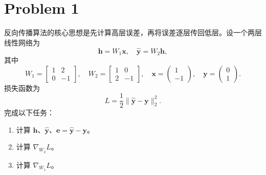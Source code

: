 \section*{Problem 1}

反向传播算法的核心思想是先计算高层误差，再将误差逐层传回低层。设一个两层线性网络为
\[
\bm{h} = W_1 \bm{x},\quad \hat{\bm{y}} = W_2 \bm{h},
\]
其中
\[
W_1 = \begin{bmatrix}
    1 & 2 \\
    0 & -1
\end{bmatrix},\quad
W_2 = \begin{bmatrix}
    1 & 0 \\
    2 & -1
\end{bmatrix},\quad
\bm{x} = \begin{pmatrix} 1 \\ -1 \end{pmatrix},\quad
\bm{y} = \begin{pmatrix} 0 \\ 1 \end{pmatrix}.
\]
损失函数为
\[
L = \frac{1}{2} \|\hat{\bm{y}} - \bm{y}\|_2^2.
\]
完成以下任务：
\begin{enumerate}
    \item 计算 $\bm{h}$、$\hat{\bm{y}}$、$\bm{e} = \hat{\bm{y}} - \bm{y}$。
    \item 计算 $\nabla_{W_2} L$。
    \item 计算 $\nabla_{W_1} L$。
\end{enumerate}

